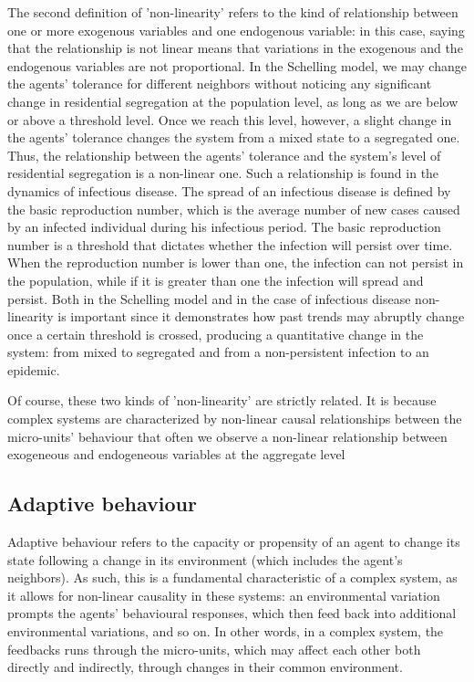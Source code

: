 \documentclass[review]{elsarticle}
\begin{document}
The second definition of 'non-linearity' refers to the kind of relationship between one or more exogenous variables and one endogenous variable: in this case, saying that the relationship is not linear means that variations in the exogenous and the endogenous variables are not proportional. In the Schelling model, we may change the agents' tolerance for different neighbors without noticing any significant change in residential segregation at the population level, as long as we are below or above a threshold level. Once we reach this level, however, a slight change in the agents' tolerance changes the system from a mixed state to a segregated one. Thus, the relationship between the agents' tolerance and the system's level of residential segregation is a non-linear one. Such a relationship is found in the dynamics of infectious disease. The spread of an infectious disease is defined by the basic reproduction number, which is the average number of new cases caused by an infected individual during his infectious period. The basic reproduction number is a threshold that dictates whether the infection will persist over time. When the reproduction number is lower than one, the infection can not persist in the population, while if it is greater than one the infection will spread and persist. Both in the Schelling model and in the case of infectious disease non-linearity is important since it demonstrates how past trends may abruptly change once a certain threshold is crossed, producing a quantitative change in the system: from mixed to segregated and from a non-persistent infection to an epidemic. 

Of course, these two kinds of 'non-linearity' are strictly related. It is because complex systems are characterized by non-linear causal relationships between the micro-units' behaviour that often we observe a non-linear relationship between exogeneous and endogeneous variables at the aggregate level

\subsection{Adaptive behaviour}
Adaptive behaviour refers to the capacity or propensity of an agent to change its state following a change in its environment (which includes the agent's neighbors). As such, this is a fundamental characteristic of a complex system, as it allows for non-linear causality in these systems: an environmental variation prompts the agents' behavioural responses, which then feed back into additional environmental variations, and so on. In other words, in a complex system, the feedbacks runs through the micro-units, which may affect each other both directly and indirectly, through changes in their common environment. 
\end{document}
